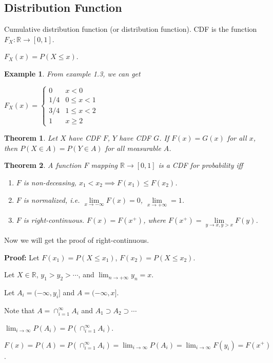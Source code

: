 \documentclass[11pt]{article}
\def\BR{{\mathbb R}}
\newtheorem{theorem}{Theorem}[section]
\newtheorem{example}{Example}[section]
\begin{document}
\subsection{Distribution Function}
Cumulative distribution function (or distribution function). CDF is the function $F_X : \BR \to [0, 1]$.

$F_X(x) = P(X \leq x)$.

\begin{example}
From example 1.3, we can get

$F_X(x) = \left\{\begin{array}{cc}
             0 & x < 0 \\
             1/4 & 0 \leq x < 1 \\
             3/4 & 1 \leq x < 2 \\
             1 & x \geq 2
           \end{array}
           \right.
$
\end{example}

\begin{theorem}
Let $X$ have CDF $F$, $Y$ have CDF $G$.
If $F(x) = G(x)$ for all $x$, then $P(X \in A) = P(Y \in A)$ for all measurable $A$.
\end{theorem}

\begin{theorem}
A function $F$ mapping $\BR \to [0, 1]$ is a CDF for probability iff
\begin{enumerate}
\item $F$ is non-deceasing, $x_1 < x_2 \implies F(x_1) \leq F(x_2)$.
\item $F$ is normalized, i.e. $\lim\limits_{x \to -\infty} F(x) = 0$, $\lim\limits_{x \to +\infty} = 1$.
\item $F$ is right-continuous. $F(x) = F(x^+)$, where $F(x^+) = \lim\limits_{y \to x, y > x} F(y)$.
\end{enumerate}
\end{theorem}

Now we will get the proof of right-continuous.

{\bf Proof: }
Let $F(x_1) = P(X \leq x_1)$, $F(x_2) = P(X \leq x_2)$.

Let $X \in \BR$, $y_1 > y_2 > \cdots$, and $\lim_{n \to +\infty} y_n = x$.

Let $A_i = (-\infty, y_i]$ and $A = (-\infty, x]$.

Note that $A = \cap_{i=1}^\infty A_i$ and $A_1 \supset A_2 \supset \cdots$

$\lim_{i \to \infty} P(A_i) = P(\cap_{i=1}^\infty A_i)$.

$F(x) = P(A) = P(\cap_{i=1}^\infty A_i) = \lim_{i\to\infty} P(A_i) = \lim_{i \to \infty} F(y_i) = F(x^+)$.
\end{document}
